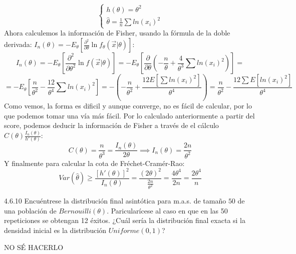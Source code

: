 \begin{sol}
\begin{enumerate}
$$\begin{cases}
        h(\theta) = \theta^2 \\
        \hat{\theta} = \frac{1}{n}\sum ln(x_i)^2
      \end{cases}$$
      Ahora calculemos la información de Fisher, usando la fórmula de la doble derivada: $I_n(\theta) = -E_{\theta}\left[\frac{\partial^2}{\partial\theta} \ln f_{\theta}(\vec{x} | \theta)\right]$:
      $$I_n(\theta) = -E_{\theta}\left[\frac{\partial^2}{\partial \theta^2} \ln f(\vec{x} | \theta)\right] = -E_{\theta}\left[\frac{\partial}{\partial \theta} \left(-\frac{n}{\theta} + \frac{4}{\theta^3} \sum ln(x_i)^2\right)\right] = $$ 
      $$ = -E_{\theta}\left[\frac{n}{\theta^2} - \frac{12}{\theta^4} \sum ln(x_i)^2\right] = -\left(-\frac{n}{\theta^2} + \frac{12E[\sum ln(x_i)^2]}{\theta^4}\right) = \frac{n}{\theta^2} - \frac{12\sum E[ln(x_i)^2]}{\theta^4}$$
      Como vemos, la forma es dificil y aunque converge, no es fácil de calcular, por lo que podemos tomar una vía más fácil. Por lo calculado anteriormente a partir del score, podemos deducir la información de Fisher a través de el cálculo $C(\theta)  \frac{I_n(\theta)}{h'(\theta)}$:
      $$C(\theta) = \frac{n}{\theta^3} = \frac{I_n(\theta)}{2\theta} \implies I_n(\theta) = \frac{2n}{\theta^2}$$
      Y finalmente para calcular la cota de Fréchet-Cramér-Rao: 
      $$Var(\hat{\theta}) \geq \frac{[h'(\theta)]^2}{I_n(\theta)} = \frac{(2\theta)^2}{\frac{2n}{\theta^2}} = \frac{4\theta^4}{2n} = \frac{2\theta^4}{n}$$
  \end{enumerate}
\end{sol}

\begin{problem}{4.6.10}
  Encuéntrese la distribución final asintótica para m.a.s. de tamaño $50$ de una población de $Bernouilli(\theta)$. Paricularícese al caso en que en las 50 repeticiones se obtengan 12 éxitos. ¿Cuál sería la distribución final exacta si la densidad inicial es la distribución $Uniforme(0,1)$?
\end{problem}
\begin{sol}
  NO SÉ HACERLO
\end{sol}
